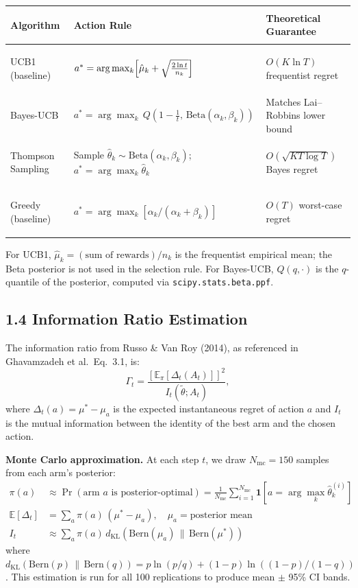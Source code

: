 \documentclass[11pt, letterpaper]{article}
\begin{document}
\begin{center}
\renewcommand{\arraystretch}{1.35}
\begin{tabular}{>{\bfseries\raggedright}p{3.2cm} >{\raggedright}p{6.5cm} >{\raggedright\arraybackslash}p{4.5cm}}
\toprule
Algorithm & Action Rule & Theoretical Guarantee \\
\midrule
UCB1 (baseline) &
  $a^* = \arg\max_k \Bigl[\hat\mu_k + \sqrt{\tfrac{2\ln t}{n_k}}\Bigr]$ &
  $O(K \ln T)$ frequentist regret \\
Bayes-UCB &
  $a^* = \arg\max_k\, Q\!\left(1 - \tfrac{1}{t},\, \text{Beta}(\alpha_k, \beta_k)\right)$ &
  Matches Lai--Robbins lower bound \\
Thompson Sampling &
  Sample $\hat\theta_k \sim \text{Beta}(\alpha_k,\beta_k)$;\; $a^* = \arg\max_k \hat\theta_k$ &
  $O\!\left(\sqrt{KT \log T}\right)$ Bayes regret \\
Greedy (baseline) &
  $a^* = \arg\max_k [\alpha_k/(\alpha_k+\beta_k)]$ &
  $O(T)$ worst-case regret \\
\bottomrule
\end{tabular}
\end{center}

For UCB1, $\hat\mu_k = (\text{sum of rewards}) / n_k$ is the frequentist empirical mean;
the Beta posterior is not used in the selection rule.
For Bayes-UCB, $Q(q,\cdot)$ is the $q$-quantile of the posterior, computed via
\texttt{scipy.stats.beta.ppf}.


\subsection{1.4 Information Ratio Estimation}

The information ratio from Russo \& Van Roy (2014), as referenced in Ghavamzadeh et al.\ Eq.\ 3.1, is:
\[
  \Gamma_t = \frac{\left[\mathbb{E}_\pi[\Delta_t(A_t)]\right]^2}{I_t(\tilde\theta; A_t)},
\]
where $\Delta_t(a) = \mu^* - \mu_a$ is the expected instantaneous regret of action $a$ and
$I_t$ is the mutual information between the identity of the best arm and the chosen action.

\textbf{Monte Carlo approximation.} At each step $t$, we draw $N_\text{mc} = 150$ samples
from each arm's posterior:
\begin{align*}
  \pi(a) &\approx \Pr(\text{arm } a \text{ is posterior-optimal}) =
    \frac{1}{N_\text{mc}} \sum_{i=1}^{N_\text{mc}} \mathbf{1}\!\left[a = \arg\max_k \hat\theta_k^{(i)}\right] \\
  \mathbb{E}[\Delta_t] &= \sum_a \pi(a)\,(\mu^* - \mu_a), \quad \mu_a = \text{posterior mean} \\
  I_t &\approx \sum_a \pi(a)\,d_\text{KL}\!\left(\text{Bern}(\mu_a) \,\|\, \text{Bern}(\mu^*)\right)
\end{align*}
where $d_\text{KL}(\text{Bern}(p)\,\|\,\text{Bern}(q)) = p\ln(p/q) + (1-p)\ln((1-p)/(1-q))$.
This estimation is run for all 100 replications to produce mean $\pm$ 95\% CI bands.
\end{document}
